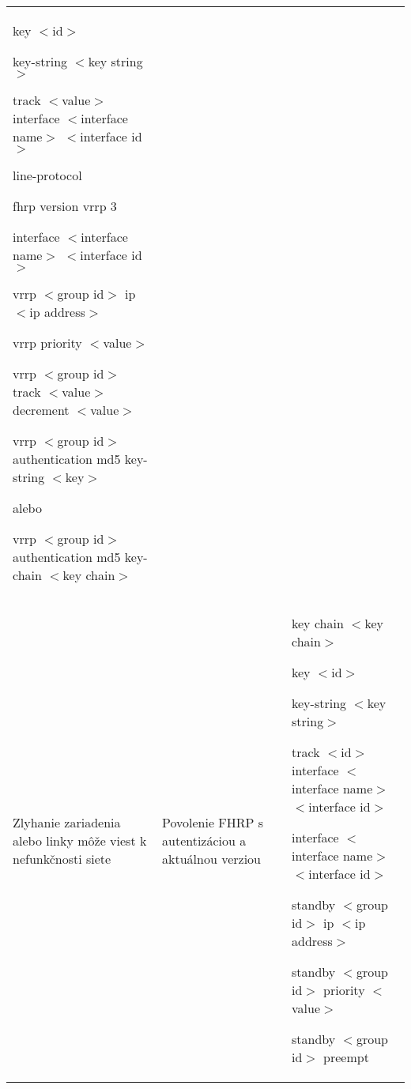 \begin{longtable}[!htbp]{|L{10em}L{10em}>{\selectfont}L{34em}|}
	\hspace{0.5em}key $<$id$>$
	
	\hspace{1em}key-string $<$key string$>$
	
	track $<$value$>$ interface $<$interface name$>$ $<$interface id$>$ 
	
	\hspace{0.5em}line-protocol
	
	fhrp version vrrp 3
	
	interface $<$interface name$>$ $<$interface id$>$
	
	\hspace{0.5em}vrrp $<$group id$>$ ip $<$ip  address$>$
	
	\hspace{0.5em}vrrp priority $<$value$>$
	
	\hspace{0.5em}vrrp $<$group id$>$ track $<$value$>$ decrement $<$value$>$
	
	\hspace{0.5em}vrrp $<$group id$>$ authentication md5 key-string $<$key$>$
	
	\vspace{0.5em}
	{\selectfont alebo}
	\vspace{0.5em}
	
	\hspace{0.5em}vrrp $<$group id$>$ authentication md5 key-chain $<$key chain$>$\\
	
	
	 Zlyhanie zariadenia alebo linky môže viest k nefunkčnosti siete 	&Povolenie FHRP s autentizáciou a aktuálnou verziou	&key chain $<$key chain$>$
	
	\hspace{0.5em}key $<$id$>$
	
	\hspace{0.5em}key-string $<$key string$>$
	
	track $<$id$>$  interface $<$interface name$>$ $<$interface id$>$
	
	interface $<$interface name$>$ $<$interface id$>$
	
	\hspace{0.5em}standby $<$group id$>$ ip $<$ip address$>$
	
	\hspace{0.5em}standby $<$group id$>$ priority $<$value$>$
	
	\hspace{0.5em}standby $<$group id$>$ preempt
	

\end{longtable}
